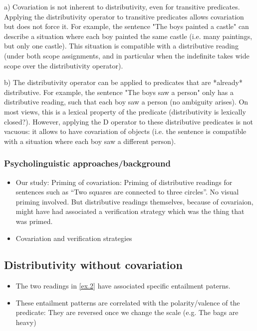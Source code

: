 \documentclass[a4paper]{article}
\begin{document}
a) Covariation is not inherent to distributivity, even for transitive predicates. Applying the distributivity operator to transitive predicates allows covariation but does not force it. For example, the sentence "The boys painted a castle" can describe a situation where each boy painted the same castle (i.e. many paintings, but only one castle). This situation is compatible with a distributive reading (under both scope assignments, and in particular when the indefinite takes wide scope over the distributivity operator). 


b) The distributivity operator can be applied to predicates that are *already* distributive. For example, the sentence "The boys saw a person" only has a distributive reading, such that each boy saw a person (no ambiguity arises). On most views, this is a lexical property of the predicate (distributivity is lexically closed?). However, applying the D operator to these distributive predicates is not vacuous: it allows to have covariation of objects (i.e. the sentence is compatible with a situation where each boy saw a different person). 


\subsubsection*{Psycholinguistic approaches/background}

\begin{itemize}
\item Our study: Priming of covariation: Priming of distributive readings for sentences such as “Two squares are connected to three circles”.
No visual priming involved. But distributive readings themselves, because of covariaion, might have had associated a verification strategy which was the thing that was primed. 
\item Covariation and verification strategies
\end{itemize}


\subsection{Distributivity without covariation}
\begin{itemize}
\item The two readings in \ref{ex.2} have associated specific entailment paterns. 
\item These entailment patterns are correlated with the polarity/valence of the predicate: They are reversed once we change the scale (e.g. The bags are heavy)
\end{itemize}
\end{document}
